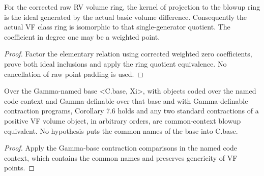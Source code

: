 \begin{theorem}

\label{s7-13}


\leanok

For the corrected raw RV volume ring, the kernel of projection to the blowup ring is the ideal generated by the actual basic volume difference. Consequently the actual VF class ring is isomorphic to that single-generator quotient. The coefficient in degree one may be a weighted point.

\end{theorem}

\begin{proof}


\leanok

Factor the elementary relation using corrected weighted zero coefficients, prove both ideal inclusions and apply the ring quotient equivalence. No cancellation of raw point padding is used.

\end{proof}

\begin{lemma}

\label{s7-gn-7}


\leanok

Over the Gamma-named base <C.base, Xi>, with objects coded over the named code context and Gamma-definable over that base and with Gamma-definable contraction programs, Corollary 7.6 holds and any two standard contractions of a positive VF volume object, in arbitrary orders, are common-context blowup equivalent. No hypothesis puts the common names of the base into C.base.

\end{lemma}

\begin{proof}


\leanok

Apply the Gamma-base contraction comparisons in the named code context, which contains the common names and preserves genericity of VF points.

\end{proof}

